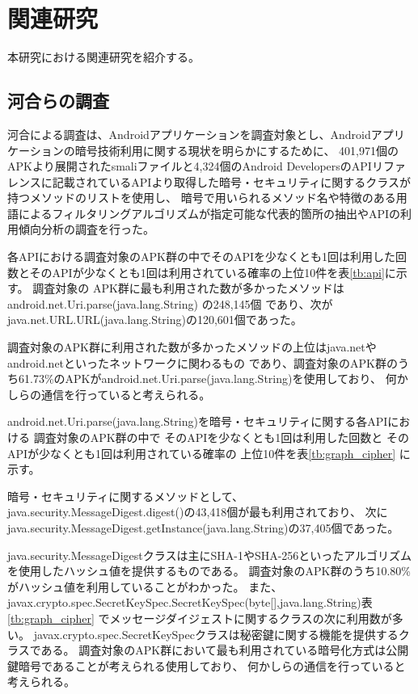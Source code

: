 \newpage
\section{関連研究} %
本研究における関連研究を紹介する。
\subsection{河合らの調査}
河合による調査は、Androidアプリケーションを調査対象とし、Androidアプリケーションの暗号技術利用に関する現状を明らかにするために、
401,971個のAPKより展開されたsmaliファイルと4,324個のAndroid DevelopersのAPIリファレンスに記載されているAPIより取得した暗号・セキュリティに関するクラスが持つメソッドのリストを使用し、
暗号で用いられるメソッド名や特徴のある用語によるフィルタリングアルゴリズムが指定可能な代表的箇所の抽出やAPIの利用傾向分析の調査を行った。


各APIにおける調査対象のAPK群の中でそのAPIを少なくとも1回は利用した回数とそのAPIが少なくとも1回は利用されている確率の上位10件を表\ref{tb:api}に示す。
調査対象の APK群に最も利用された数が多かったメソッドは
android.net.Uri.parse(java.lang.String) の248,145個
であり、次がjava.net.URL.URL(java.lang.String)の120,601個であった。


調査対象のAPK群に利用された数が多かったメソッドの上位はjava.netやandroid.netといったネットワークに関わるもの
であり、調査対象のAPK群のうち61.73\%のAPKがandroid.net.Uri.parse(java.lang.String)を使用しており、
何かしらの通信を行っていると考えられる。

android.net.Uri.parse(java.lang.String)を暗号・セキュリティに関する各APIにおける
調査対象のAPK群の中で
そのAPIを少なくとも1回は利用した回数と
そのAPIが少なくとも1回は利用されている確率の
上位10件を表\ref{tb:graph_cipher}
に示す。

暗号・セキュリティに関するメソッドとして、
java.security.MessageDigest.digest()の43,418個が最も利用されており、
次にjava.security.MessageDigest.getInstance(java.lang.String)の37,405個であった。


java.security.MessageDigestクラスは主にSHA-1やSHA-256といったアルゴリズムを使用したハッシュ値を提供するものである。
調査対象のAPK群のうち10.80\%がハッシュ値を利用していることがわかった。
また、
javax.crypto.spec.SecretKeySpec.SecretKeySpec(byte[],java.lang.String)表\ref{tb:graph_cipher}
でメッセージダイジェストに関するクラスの次に利用数が多い。
javax.crypto.spec.SecretKeySpecクラスは秘密鍵に関する機能を提供するクラスである。
調査対象のAPK群において最も利用されている暗号化方式は公開鍵暗号であることが考えられる使用しており、
何かしらの通信を行っていると考えられる。


